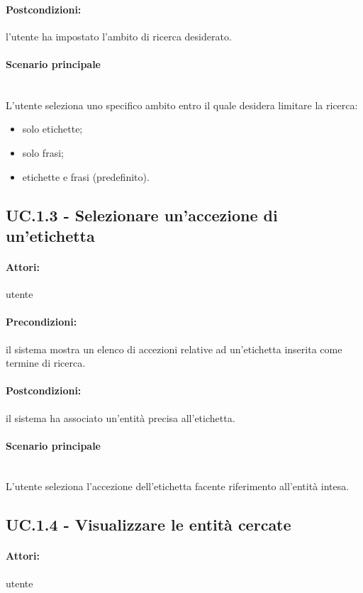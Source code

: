\documentclass[10pt,a4paper,headinclude,footinclude,hidelinks]{scrreprt} %
\begin{document}
	\paragraph{Postcondizioni:} l'utente ha impostato l'ambito di ricerca desiderato.
	\paragraph{Scenario principale} \hfill \\
	L'utente seleziona uno specifico ambito entro il quale desidera limitare la ricerca:
	\begin{itemize}
	\item solo etichette;
	\item solo frasi;
	\item etichette e frasi (predefinito).
	\end{itemize}

	\subsection[UC.1.3]{UC.1.3 - Selezionare un'accezione di un'etichetta}
	\label{sec:stage:ar:uc:1_3}
	\paragraph{Attori:} utente
	\paragraph{Precondizioni:} il sistema mostra un elenco di accezioni relative ad un'etichetta inserita come termine di ricerca.
	\paragraph{Postcondizioni:} il sistema ha associato un'entità precisa all'etichetta.
	\paragraph{Scenario principale}  \hfill \\
	L'utente seleziona l'accezione dell'etichetta facente riferimento all'entità intesa.

	\subsection[UC.1.4]{UC.1.4 - Visualizzare le entità cercate}
	\label{sec:stage:ar:uc:1_4}
	\paragraph{Attori:} utente
\end{document}
